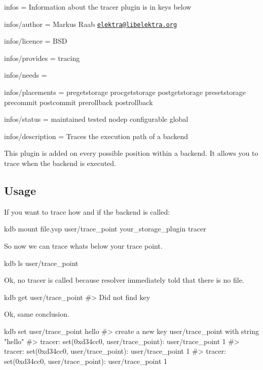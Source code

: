 
\begin{DoxyItemize}
\item infos = Information about the tracer plugin is in keys below
\item infos/author = Markus Raab \href{mailto:elektra@libelektra.org}{\tt elektra@libelektra.\+org}
\item infos/licence = B\+SD
\item infos/provides = tracing
\item infos/needs =
\item infos/placements = pregetstorage procgetstorage postgetstorage presetstorage precommit postcommit prerollback postrollback
\item infos/status = maintained tested nodep configurable global
\item infos/description = Traces the execution path of a backend
\end{DoxyItemize}

This plugin is added on every possible position within a backend. It allows you to trace when the backend is executed.

\subsection*{Usage}

If you want to trace how and if the backend is called\+:


\begin{DoxyCode}
kdb mount file.ysp user/trace\_point your\_storage\_plugin tracer
\end{DoxyCode}


So now we can trace whats below your trace point.


\begin{DoxyCode}
kdb ls user/trace\_point
\end{DoxyCode}


Ok, no tracer is called because resolver immediately told that there is no file.


\begin{DoxyCode}
kdb get user/trace\_point
#> Did not find key
\end{DoxyCode}


Ok, same conclusion.


\begin{DoxyCode}
kdb set user/trace\_point hello
#> create a new key user/trace\_point with string "hello"
#> tracer: set(0xd34cc0, user/trace\_point): user/trace\_point 1
#> tracer: set(0xd34cc0, user/trace\_point): user/trace\_point 1
#> tracer: set(0xd34cc0, user/trace\_point): user/trace\_point 1
\end{DoxyCode}


